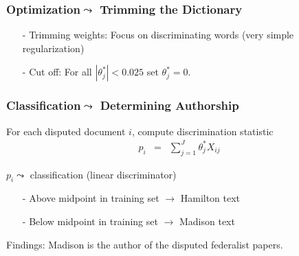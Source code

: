 \documentclass{beamer}
\numberwithin{equation}{section}
\begin{document}
\begin{frame}
\frametitle{Optimization$\leadsto$ Trimming the Dictionary}


\begin{itemize}
\item[-] Trimming weights: Focus on discriminating words (very simple \alert{regularization})
\item[-] Cut off: For all $|\theta^{*}_{j}|<0.025$ set $\theta^{*}_{j} = 0$.
\end{itemize}



\end{frame}


\begin{frame}
\frametitle{Classification$\leadsto$ Determining Authorship}

For each disputed document $i$, compute discrimination statistic
\begin{eqnarray}
p_{i}  & = & \sum_{j =1}^{J} \theta^{*}_{j} X_{ij} \nonumber
\end{eqnarray}

$p_i \leadsto$ classification (\alert{linear discriminator})
\begin{itemize}
\item[-] Above midpoint in training set $\rightarrow$ Hamilton text
\item[-] Below midpoint in training set $\rightarrow$ Madison text
\end{itemize}

\alert{Findings}: Madison is the author of the disputed federalist papers.


\end{frame}
\end{document}
